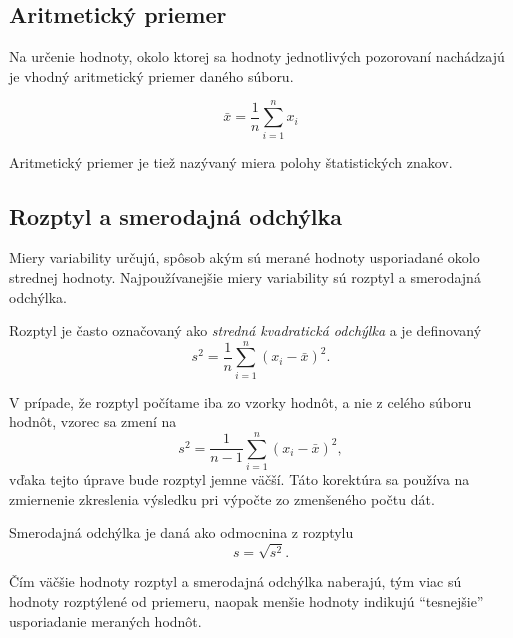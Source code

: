 \subsection{Aritmetický priemer}
Na určenie hodnoty, okolo ktorej sa hodnoty jednotlivých pozorovaní nachádzajú je vhodný aritmetický priemer daného súboru. 

\begin{equation}
\bar{x} = \frac{1}{n} \sum\limits_{i=1}^{n} x_i
\end{equation}

Aritmetický priemer je tiež nazývaný miera polohy štatistických znakov.

\subsection{Rozptyl a smerodajná odchýlka}

Miery variability určujú, spôsob akým sú merané hodnoty usporiadané okolo strednej hodnoty. Najpoužívanejšie miery variability sú rozptyl a smerodajná odchýlka.

Rozptyl je  často označovaný ako \textit{stredná kvadratická odchýlka} a je definovaný
\begin{equation}
s^2 = \frac{1}{n}\sum\limits_{i=1}^{n}(x_i - \bar{x})^2.
\end{equation}

V prípade, že rozptyl počítame iba zo vzorky hodnôt, a nie z celého súboru hodnôt, vzorec sa zmení na
 \begin{equation}
s^2 = \frac{1}{n-1}\sum\limits_{i=1}^{n}(x_i - \bar{x})^2,
\end{equation}
vďaka tejto úprave bude rozptyl jemne väčší. Táto korektúra sa používa na zmiernenie zkreslenia výsledku pri výpočte zo zmenšeného počtu dát.

Smerodajná odchýlka je daná ako odmocnina z rozptylu
\begin{equation}
s = \sqrt{s^2}.
\end{equation}

Čím väčšie hodnoty rozptyl a smerodajná odchýlka naberajú, tým viac sú hodnoty rozptýlené od priemeru, naopak menšie hodnoty indikujú ``tesnejšie'' usporiadanie meraných hodnôt.


